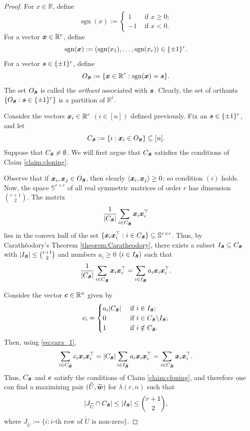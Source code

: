 \documentclass[11pt]{article}
\theoremstyle{plain}
\numberwithin{equation}{section}
\DeclareMathOperator{\sgn}{sgn}
\def\cvec{\mbox{\boldmath $c$}}
\def\w{\mbox{\boldmath $w$}}
\def\s{\mbox{\boldmath $s$}}
\def\x{\mbox{\boldmath $x$}}
\newcommand{\ip}[2]{\langle #1, #2 \rangle}
\begin{document}
\begin{proof} For $x\in \mathbb{R}$, define
\[ 
\sgn(x):=
\begin{cases}
   1 & \text{ if }x\ge 0;\\
   -1 & \text{ if }x<0.
\end{cases}
\]
For a vector $\x\in \mathbb{R}^r$, define 
\[\sgn(\x) := (\sgn(x_1), \ldots, \sgn(x_r))\in \{\pm 1\}^r.\]
For a vector $\s\in \{\pm 1 \}^r$, define 
\[O_{\s}:=\{\x\in \mathbb{R}^r: \sgn(\x) = \s\}.\] 
The set $O_{\s}$ is called the \emph{orthant} associated with $\s$. Clearly, the set of orthants $\{O_{\s}:\s \in \{\pm 1\}^r\}$ is a partition of $\mathbb{R}^r$.

Consider the vectors $\x_i\in \mathbb{R}^r$ $(i\in [n])$ defined previously. Fix an $\s\in \{\pm 1\}^r$, and let 
\[C_{\s} := \{i: \x_i\in O_{\s}\}\subseteq [n].\] 
Suppose that $C_{\s}\neq \emptyset$. We will first argue that $C_{\s}$ satisfies the conditions of Claim \ref{claim:cloning}. 

Observe that if $\x_i, \x_j\in O_{\s}$, then clearly $\ip{\x_i}{\x_j}\ge 0$; so condition $(i)$ holds. Now, the space $\mathbb{S}^{r\times r}$ of all real symmetric matrices of order $r$ has dimension ${r+1 \choose 2}$. The matrix 
\[ \frac{1}{|C_{\s}|}\sum_{i\in C_{\s}}\x_i\x_i^\top \]
lies in the convex hull of the set $\{\x_i\x_i^\top: i\in C_{\s}\}\subseteq \mathbb{S}^{r\times r}$. Thus, by Carath\'eodory's Theorem \ref{theorem:Caratheodory}, there exists a subset $I_{\s}\subseteq C_{\s}$ with $|I_{\s}|\le {r+1\choose 2}$ and numbers $a_i\ge 0$ $(i\in I_{\s})$ such that 
\begin{equation}\label{eq:cara_1}
\frac{1}{|C_{\s}|}\sum_{i\in C_{\s}}\x_i\x_i^\top  = \sum_{i\in I_{\s}}a_i\x_i\x_i^\top. 
\end{equation}

Consider the vector $\cvec\in \mathbb{R}^n$ given by 
\[ c_i = 
\begin{cases}
    a_i|C_{\s}|  & \text{ if }i\in I_{\s};\\
    0 & \text{ if }i\in C_{\s}\backslash I_{\s};\\
    1 & \text{ if }i\notin C_{\s}.
\end{cases}\]
Then, using \eqref{eq:cara_1},  
\[\sum_{i\in C_{\s}}c_i\x_i\x_i^\top = |C_{\s}|\sum_{i\in I_{\s}}a_i\x_i\x_i^\top = \sum_{i\in C_{\s}}\x_i\x_i^\top.\]
Thus, $C_{\s}$ and $\cvec$ satisfy the conditions of Claim \ref{claim:cloning}, and therefore one can find a maximizing pair $(\widetilde{U}, \widetilde{\w})$ for $\lambda(r,n)$ such that 
\[|J_{\widetilde{U}}\cap C_{\s}|\le |I_{\s}|\le {r+1\choose 2},\]
where $J_{\widetilde{U}}:=\{i: i\text{-th row of }\widetilde{U} \text{ is non-zero}\}$. 


\end{proof}
\end{document}
